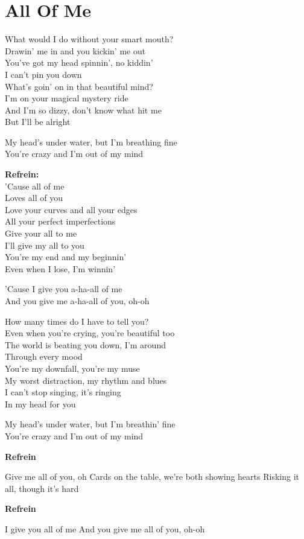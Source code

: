 \section{All Of Me}
What would I do without your smart mouth?\\
Drawin' me in and you kickin' me out\\
You've got my head spinnin', no kiddin'\\
I can't pin you down\\
What's goin' on in that beautiful mind?\\
I'm on your magical mystery ride\\
And I'm so dizzy, don't know what hit me\\
But I'll be alright

My head's under water, but I'm breathing fine\\
You're crazy and I'm out of my mind

\textbf{Refrein:}\\
'Cause all of me\\
Loves all of you\\
Love your curves and all your edges\\
All your perfect imperfections\\
Give your all to me\\
I'll give my all to you\\
You're my end and my beginnin'\\
Even when I lose, I'm winnin'

'Cause I give you a-ha-all of me\\
And you give me a-ha-all of you, oh-oh

How many times do I have to tell you?\\
Even when you're crying, you're beautiful too\\
The world is beating you down, I'm around\\
Through every mood\\
You're my downfall, you're my muse\\
My worst distraction, my rhythm and blues\\
I can't stop singing, it's ringing\\
In my head for you

My head's under water, but I'm breathin' fine\\
You're crazy and I'm out of my mind

\textbf{Refrein}

Give me all of you, oh
Cards on the table, we're both showing hearts
Risking it all, though it's hard

\textbf{Refrein}

I give you all of me
And you give me all of you, oh-oh
